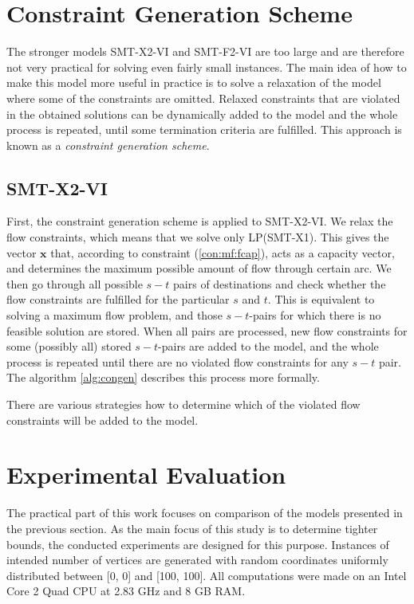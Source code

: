 \section{Constraint Generation Scheme}
\label{sec:cg}
The stronger models SMT-X2-VI and SMT-F2-VI are too large and are therefore not very practical for solving even fairly small instances.  The main idea of how to make this model more useful in practice is to solve a relaxation of the model where some of the constraints are omitted. Relaxed constraints that are violated in the obtained solutions can be dynamically added to the model and the whole process is repeated, until some termination criteria are fulfilled. This approach is known as a \emph{constraint generation scheme}.

\subsection{SMT-X2-VI}%
First, the constraint generation scheme is applied to SMT-X2-VI. We relax the flow constraints, which means that we solve only LP(SMT-X1). This gives the vector $\mathbf{x}$ that, according to constraint (\ref{con:mf:fcap}), acts as a capacity vector, and determines the maximum possible amount of flow through certain arc. We then go through all possible $s-t$ pairs of destinations and check whether the flow constraints are fulfilled for the particular $s$ and $t$. This is equivalent to solving a maximum flow problem, and those $s-t$-pairs for which there is no feasible solution are stored. When all pairs are processed, new flow constraints for some (possibly all) stored $s-t$-pairs are added to the model, and the whole process is repeated until there are no violated flow constraints for any $s-t$ pair. The algorithm \ref{alg:congen} describes this process more formally.

There are various strategies how to determine which of the violated flow constraints will be added to the model. 


\section{Experimental Evaluation}
\label{sec:exp}

The practical part of this work focuses on comparison of the models presented in the previous section. As the main focus of this study is to determine tighter bounds, the conducted experiments are designed for this purpose. Instances of intended number of vertices are generated with random coordinates uniformly distributed between [0, 0] and [100, 100]. All computations were made on an Intel Core 2 Quad CPU at 2.83 GHz and 8 GB RAM. 
